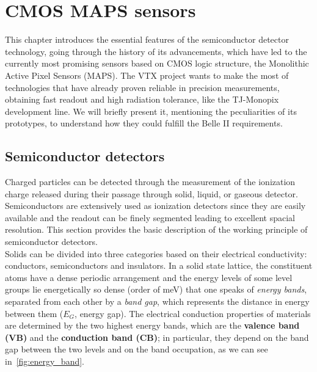 \chapter{CMOS MAPS sensors} \label{ch:CMOS}

This chapter introduces the essential features of the semiconductor detector technology, going through the history of its advancements, which have led to the currently most promising sensors based on CMOS logic structure, the Monolithic Active Pixel Sensors (MAPS). The VTX project wants to make the most of technologies that have already proven reliable in precision measurements, obtaining fast readout and high radiation tolerance, like the TJ-Monopix development line. We will briefly present it, mentioning the peculiarities of its prototypes, to understand how they could fulfill the Belle II requirements.


\section{Semiconductor detectors} 

Charged particles can be detected through the measurement of the ionization charge released during their passage through solid, liquid, or gaseous detector. Semiconductors are extensively used as ionization detectors since they are easily available and the readout can be finely segmented leading to excellent spacial resolution. This section provides the basic description of the working principle of semiconductor detectors.\\

Solids can be divided into three categories based on their electrical conductivity: conductors, semiconductors and insulators. 
In a solid state lattice, the constituent atoms have a dense periodic arrangement and the energy levels of some level groups lie energetically so dense (order of meV) that one speaks of \emph{energy bands}, separated from each other by a \emph{band gap}, which represents the distance in energy between them (\textbf{$E_{G}$}, energy gap). The electrical conduction properties of materials are determined by the two highest energy bands, which are the \textbf{valence band (VB)} and the \textbf{conduction band (CB)}; in particular, they depend on the band gap between the two levels and on the band occupation, as we can see in~\autoref{fig:energy_band}.


